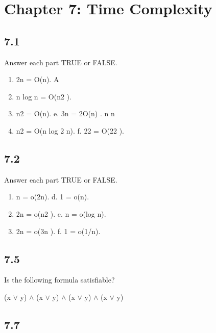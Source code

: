 \section{Chapter 7: Time Complexity}

\subsection*{7.1}

Answer each part TRUE or FALSE.

\begin{enumerate}[label=(\alph*), leftmargin=2.5em]

\item 2n = O(n). A

\item n log n = O(n2 ).

\item n2 = O(n). e. 3n = 2O(n) . n n

\item n2 = O(n log 2 n). f. 22 = O(22 ).

\end{enumerate}


\subsection*{7.2}

Answer each part TRUE or FALSE.

\begin{enumerate}[label=(\alph*), leftmargin=2.5em]

\item n = o(2n). d. 1 = o(n).

\item 2n = o(n2 ). e. n = o(log n).

\item 2n = o(3n ). f. 1 = o(1/n).

\end{enumerate}


\subsection*{7.5}

Is the following formula satisfiable?

(x $\lor$ y) $\land$ (x $\lor$ y) $\land$ (x $\lor$ y) $\land$ (x $\lor$ y)


\subsection*{7.7}

